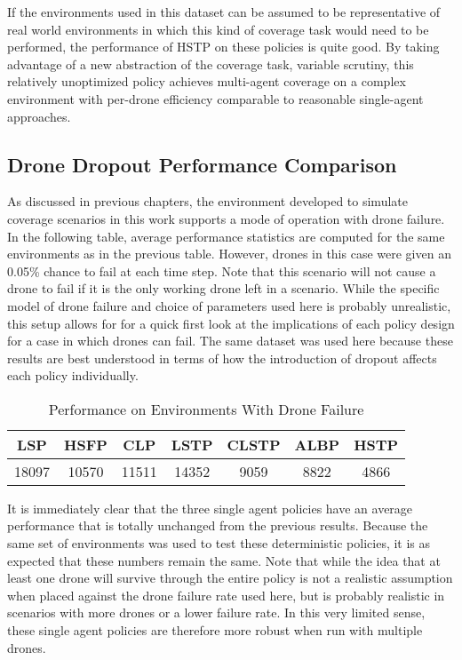 If the environments used in this dataset can be assumed to be representative of real world environments in which this kind of coverage task would need to be performed, the performance of HSTP on these policies is quite good. By taking advantage of a new abstraction of the coverage task, variable scrutiny, this relatively unoptimized policy achieves multi-agent coverage on a complex environment with per-drone efficiency comparable to reasonable single-agent approaches.

\subsection{Drone Dropout Performance Comparison}

As discussed in previous chapters, the environment developed to simulate coverage scenarios in this work supports a mode of operation with drone failure. In the following table, average performance statistics are computed for the same environments as in the previous table. However, drones in this case were given an 0.05\% chance to fail at each time step. Note that this scenario will not cause a drone to fail if it is the only working drone left in a scenario. While the specific model of drone failure and choice of parameters used here is probably unrealistic, this setup allows for for a quick first look at the implications of each policy design for a case in which drones can fail. The same dataset was used here because these results are best understood in terms of how the introduction of dropout affects each policy individually.

\begin{table}[h]
\begin{center}
 \begin{tabular}{||c c c c c c c ||}
 \hline
 LSP   & HSFP  & CLP   & LSTP  & CLSTP & ALBP & HSTP \\
 \hline
 18097 & 10570 & 11511 & 14352 & 9059  & 8822 & 4866 \\
 \hline
 \end{tabular}
\end{center}
\caption{Performance on Environments With Drone Failure}
\end{table}

It is immediately clear that the three single agent policies have an average performance that is totally unchanged from the previous results. Because the same set of environments was used to test these deterministic policies, it is as expected that these numbers remain the same. Note that while the idea that at least one drone will survive through the entire policy is not a realistic assumption when placed against the drone failure rate used here, but is probably realistic in scenarios with more drones or a lower failure rate. In this very limited sense, these single agent policies are therefore more robust when run with multiple drones.

